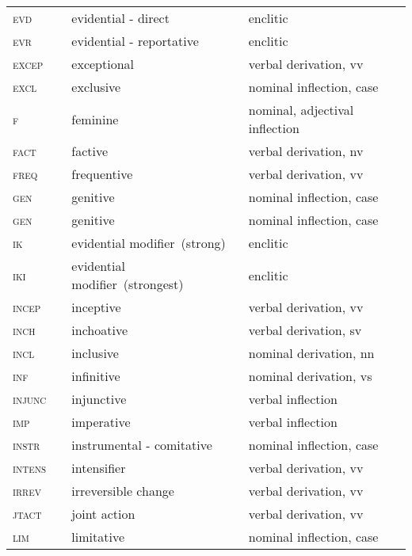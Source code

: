 \begin{refsection}
\begin{small}
\begin{longtable}{*{4}{@{\hspace{1ex}}l}@{\hspace{1ex}}}
\textsc{evd} 		&  		& evidential - direct 			& enclitic\\
\textsc{evr} 		&  		& evidential - reportative 		& enclitic\\
\textsc{excep} 		&  		& exceptional 				& verbal derivation, vv\\
\textsc{excl} 		&  	& exclusive 				& nominal inflection, case\\
\textsc{f} 		&  		& feminine 				& nominal, adjectival inflection\\
\textsc{fact} 		&  	& factive 				& verbal derivation, nv\\
\textsc{freq} 		&  	& frequentive 				& verbal derivation, vv\\
\textsc{gen} 	&  	& genitive 				& nominal inflection, case\\
\textsc{gen} 	&  	& genitive 				& nominal inflection, case\\
\textsc{ik} 		&  		& evidential modifier~(strong) 		& enclitic\\
\textsc{iki} 		&  		& evidential modifier~(strongest) 	& enclitic\\
\textsc{incep} 	&  	& inceptive 				& verbal derivation, vv\\
\textsc{inch} 		&  	& inchoative 				& verbal derivation, sv\\
\textsc{incl} 		&  	& inclusive 				& nominal derivation, nn\\
\textsc{inf} 		&  	& infinitive 				& nominal derivation, vs\\
\textsc{injunc} 	&  	& injunctive 				& verbal inflection\\
\textsc{imp} 		&  	& imperative 				& verbal inflection\\
\textsc{instr}		&  	& instrumental - comitative 		& nominal inflection, case\\
\textsc{intens} 	&  	& intensifier 				& verbal derivation, vv\\
\textsc{irrev} 		& 	& irreversible change 			& verbal derivation, vv\\
\textsc{jtact} 		&  	& joint action 				& verbal derivation, vv\\
\textsc{lim} 	& 	& limitative 				& nominal inflection, case\\

\end{longtable}
\end{small}
\end{refsection}

